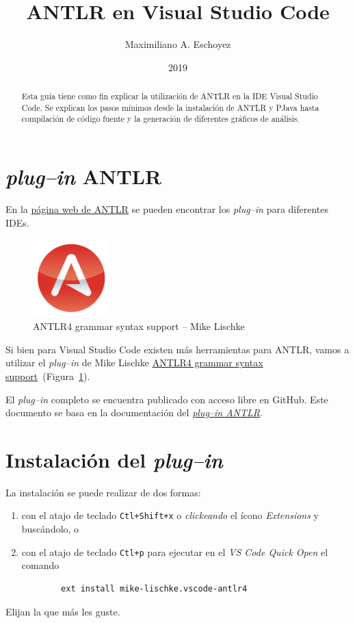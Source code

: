 \documentclass[a5paper,10pt]{article}
\author{Maximiliano A. Eschoyez}
\title{ANTLR en Visual Studio Code}
\date{2019}
\begin{document}
\maketitle

\begin{abstract}
	Esta guía tiene como fin explicar la utilización de ANTLR en la IDE Visual Studio Code.  Se explican los pasos mínimos desde la instalación de ANTLR y PJava hasta compilación de código fuente y la generación de diferentes gráficos de análisis.
\end{abstract}

\section{\emph{plug--in} ANTLR}
\label{intro}

En la \href{https://www.antlr.org/tools.html}{página web de ANTLR} se pueden encontrar los \emph{plug--in} para diferentes IDEs.

\begin{figure}[b]
	\centering
	\includegraphics[width=3cm]{IconoANTLRvscode}
	\caption{ANTLR4 grammar syntax support -- Mike Lischke}
	\label{icono}
\end{figure}

Si bien para Visual Studio Code existen más herramientas para ANTLR, vamos a utilizar el \emph{plug--in} de Mike Lischke \href{https://marketplace.visualstudio.com/items?itemName=mike-lischke.vscode-antlr4}{ANTLR4 grammar syntax support}~(Figura~\ref{icono}).

El \emph{plug--in} completo se encuentra publicado con acceso libre en GitHub.  Este documento se basa en la documentación del \href{https://github.com/mike-lischke/vscode-antlr4/tree/master/doc}{\emph{plug--in ANTLR}}.



\section{Instalación del \emph{plug--in}}
\label{instalacion}

La instalación se puede realizar de dos formas:
\begin{enumerate}
	\item con el atajo de teclado \verb|Ctl+Shift+x| o \emph{clickeando} el ícono \emph{Extensions} y buscándolo, o
    \item con el atajo de teclado \verb|Ctl+p| para ejecutar en el \emph{VS Code Quick Open} el comando
    \begin{verbatim}
		ext install mike-lischke.vscode-antlr4
	\end{verbatim}
\end{enumerate}
Elijan la que más les guste. 
\end{document}

